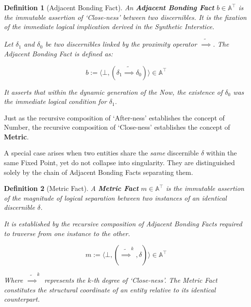 \documentclass[11pt, a4paper]{article}
\theoremstyle{formalism}
\newtheorem{formalism}{Definition}
\begin{document}
\begin{formalism}[Adjacent Bonding Fact]

    An \textbf{Adjacent Bonding Fact} $b \in \mathbb{A}^\top$ is the immutable assertion of `Close-ness' between two discernibles. It is the fixation of the immediate logical implication derived in the Synthetic Interstice.

    Let $\delta_1$ and $\delta_0$ be two discernibles linked by the proximity operator $\tilde{\implies}$. The Adjacent Bonding Fact is defined as:

    \begin{equation}
        b := \langle \bot, (\delta_1 \tilde{\implies} \delta_0) \rangle \in \mathbb{A}^\top
    \end{equation}

    It asserts that within the dynamic generation of the Now, the existence of $\delta_0$ was the immediate logical condition for $\delta_1$.

\end{formalism}

Just as the recursive composition of `After-ness' establishes the concept of Number, the recursive composition of `Close-ness' establishes the concept of \textbf{Metric}.

A special case arises when two entities share the \textit{same} discernible $\delta$ within the same Fixed Point, yet do not collapse into singularity. They are distinguished solely by the chain of Adjacent Bonding Facts separating them.

\begin{formalism}[Metric Fact]

    A \textbf{Metric Fact} $m \in \mathbb{A}^\top$ is the immutable assertion of the magnitude of logical separation between two instances of an identical discernible $\delta$.

    It is established by the recursive composition of Adjacent Bonding Facts required to traverse from one instance to the other.

    \begin{equation}
        m := \langle \bot, (\tilde{\implies}^k, \delta) \rangle \in \mathbb{A}^\top
    \end{equation}

    Where $\tilde{\implies}^k$ represents the $k$-th degree of `Close-ness'. The Metric Fact constitutes the structural coordinate of an entity relative to its identical counterpart.

\end{formalism}
\end{document}

